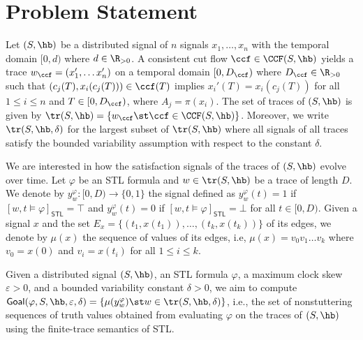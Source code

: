 \section{Problem Statement}
Let $(S,{\hb})$ be a distributed signal of $n$ signals $x_1, \ldots, x_n$ with the temporal domain $[0,d)$ where $d \in \R_{> 0}$.
A consistent cut flow $\ccf \in \CCF(S,{\hb})$ yields a trace $w_{\ccf} = 
(x'_1, \ldots x'_n)$ on a temporal domain $[0,D_{\ccf})$ where $D_{\ccf} \in \R_{> 0}$ such that $(c_j(T), 
x_i(c_j(T))) \in \ccf(T)$ implies $x_i'(T) = x_i(c_j(T))$ for all $1 \leq i \leq n$ 
and $T \in [0, D_{\ccf})$, where $A_j = \pi(x_i)$.
The set of traces of $(S,{\hb})$ is given by $\tr(S,{\hb}) = \{ w_{\ccf} \st \ccf \in \CCF(S,{\hb})\}$.
Moreover, we write $\tr(S,{\hb},\delta)$ for the largest subset of $\tr(S,{\hb})$ where all signals of all traces satisfy the bounded variability assumption with respect to the constant $\delta$.

We are interested in how the satisfaction signals of the traces of $(S,{\hb})$ evolve over time.
Let $\varphi$ be an STL formula and $w \in \tr(S,{\hb})$ be a trace of length $D$.
We denote by $y_w^\varphi : [0,D) \to \{0,1\}$ the signal defined as $y_w^\varphi(t) = 1$ if $[w, t \models \varphi]_{\mathsf{STL}} = \top$ and $y_w^\varphi(t) = 0$ if $[w, t \models \varphi]_{\mathsf{STL}} = \bot$ for all $t \in [0,D)$.
Given a signal $x$ and the set $E_x = \{(t_1, x(t_1)), \ldots, (t_k, x(t_k))\}$ of its edges, we denote by $\mu(x)$ the sequence of values of its edges, i.e, $\mu(x) = v_0 v_1 \ldots v_k$ where $v_0 = x(0)$ and $v_i = x(t_i)$ for all $1 \leq i \leq k$.

Given a distributed signal $(S, {\hb})$, an STL formula $\varphi$, a maximum clock skew $\varepsilon > 0$, and a bounded variability constant $\delta > 0$, we aim to compute $\mathsf{Goal}(\varphi, S, {\hb}, \varepsilon, \delta) = \{ \mu(y_w^\varphi) \st w \in \tr(S, {\hb}, \delta) \}$, i.e., the set of nonstuttering sequences of truth values obtained from evaluating $\varphi$ on the traces of $(S, {\hb})$ using the finite-trace semantics of STL.